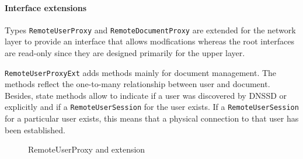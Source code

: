 \paragraph{Interface extensions}
Types  \texttt{RemoteUserProxy}  and  \texttt{RemoteDocumentProxy} are extended for the network layer to provide an interface that allows modfications whereas the root interfaces are read-only since they are designed primarily for the upper layer.

 \texttt{RemoteUserProxyExt} adds methods mainly for document management. The methods reflect the one-to-many relationship between user and document. Besides, state methods allow to indicate if a user was discovered by DNSSD or explicitly and if a \texttt{RemoteUserSession} for the user exists. If a \texttt{RemoteUserSession} for a particular user exists, this means that a physical connection to that user has been established.

\begin{figure}[H]
 \centering
 \caption{RemoteUserProxy and extension}
 \label{fig:network.discovery.remoteuserproxy.uml}
\end{figure}


